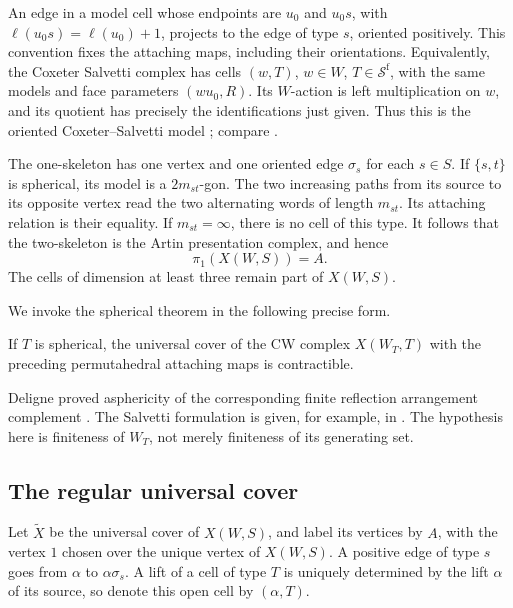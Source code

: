 An edge in a model cell whose endpoints are $u_0$ and $u_0s$, with
$\ell(u_0s)=\ell(u_0)+1$, projects to the edge of type $s$, oriented
positively.  This convention fixes the attaching maps, including their
orientations.  Equivalently, the Coxeter Salvetti complex has cells
$(w,T)$, $w\in W$, $T\in\mathcal S^{\mathrm f}$, with the same models
and face parameters $(wu_0,R)$.  Its $W$-action is left multiplication
on $w$, and its quotient has precisely the identifications just given.
Thus this is the oriented Coxeter--Salvetti model
\cite[Theorem~1.4]{Salvetti1994}; compare
\cite[Theorem~3.3 and Section~5]{Paolini2026}.

The one-skeleton has one vertex and one oriented edge $\sigma_s$ for
each $s\in S$.  If $\{s,t\}$ is spherical, its model is a $2m_{st}$-gon.
The two increasing paths from its source to its opposite vertex read
the two alternating words of length $m_{st}$.  Its attaching relation
is their equality.  If $m_{st}=\infty$, there is no cell of this type.
It follows that the two-skeleton is the Artin presentation complex,
and hence
\begin{equation}
  \pi_1(X(W,S))=A.
  \label{eq:topology-fundamental-group}
\end{equation}
The cells of dimension at least three remain part of $X(W,S)$.

We invoke the spherical theorem in the following precise form.

\begin{theorem}
\label{thm:topology-spherical-asphericity}
If $T$ is spherical, the universal cover of the CW complex
$X(W_T,T)$ with the preceding permutahedral attaching maps is
contractible.
\end{theorem}

Deligne proved asphericity of the corresponding finite reflection
arrangement complement \cite[opening theorem, p.~273]{Deligne1972}.
The Salvetti formulation is given, for example, in
\cite[Theorem 3.3 and Corollary 5.7]{Paolini2026}.
The hypothesis here is finiteness of $W_T$, not merely finiteness
of its generating set.

\subsection{The regular universal cover}

Let $\widetilde X$ be the universal cover of $X(W,S)$, and label its
vertices by $A$, with the vertex $1$ chosen over the unique vertex of
$X(W,S)$.  A positive edge of type $s$ goes from $\alpha$ to
$\alpha\sigma_s$.  A lift of a cell of type $T$ is uniquely determined
by the lift $\alpha$ of its source, so denote this open cell by
$(\alpha,T)$.


